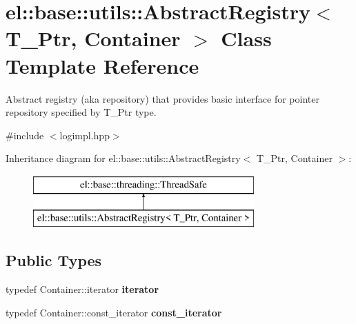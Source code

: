 \hypertarget{classel_1_1base_1_1utils_1_1AbstractRegistry}{\section{el\-:\-:base\-:\-:utils\-:\-:Abstract\-Registry$<$ T\-\_\-\-Ptr, Container $>$ Class Template Reference}
\label{classel_1_1base_1_1utils_1_1AbstractRegistry}
}


Abstract registry (aka repository) that provides basic interface for pointer repository specified by T\-\_\-\-Ptr type.  




{\ttfamily \#include $<$logimpl.\-hpp$>$}

Inheritance diagram for el\-:\-:base\-:\-:utils\-:\-:Abstract\-Registry$<$ T\-\_\-\-Ptr, Container $>$\-:\begin{figure}[H]
\begin{center}
\leavevmode
\includegraphics[height=2.000000cm]{classel_1_1base_1_1utils_1_1AbstractRegistry}
\end{center}
\end{figure}
\subsection*{Public Types}
\begin{DoxyCompactItemize}
\item 
\hypertarget{classel_1_1base_1_1utils_1_1AbstractRegistry_a58d0536c748633afd3f7c237b63a9a7c}{typedef Container\-::iterator {\bfseries iterator}}\label{classel_1_1base_1_1utils_1_1AbstractRegistry_a58d0536c748633afd3f7c237b63a9a7c}

\item 
\hypertarget{classel_1_1base_1_1utils_1_1AbstractRegistry_a3bbf19b112c067cb1a02a82b003cc7e2}{typedef Container\-::const\-\_\-iterator {\bfseries const\-\_\-iterator}}\label{classel_1_1base_1_1utils_1_1AbstractRegistry_a3bbf19b112c067cb1a02a82b003cc7e2}

\end{DoxyCompactItemize}
